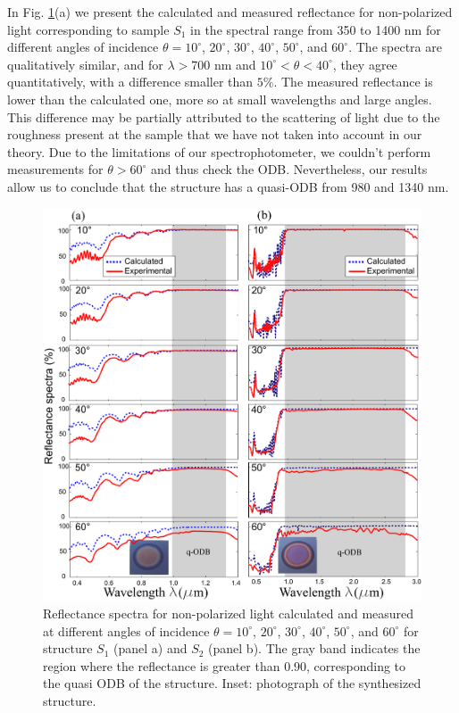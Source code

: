 \documentclass[a4paper,fleqn]{cas-sc}
\begin{document}
	In Fig. \ref{Fig2}(a) we present the calculated and measured
	reflectance for non-polarized light corresponding to sample $S_1$ in the spectral range from 350 to 1400
	nm for different angles of
	incidence $\theta=10^\circ$, $20^\circ$, $30^\circ$, $40^\circ$,
	$50^\circ$, and $60^\circ$. The spectra are qualitatively
	similar, and for $\lambda>700$ nm and $10^\circ < \theta <
	40^\circ$, they agree quantitatively, with a difference smaller
	than $5\%$.
	The
	measured reflectance is lower than the calculated one, more so at
	small wavelengths and large angles. This difference
	may be partially attributed to the scattering of light due to the
	roughness present at the sample
	\cite{Theiss1994,Chavez2020,Ortiz2020} that we have not taken into
	account in our theory. Due to the limitations of our
	spectrophotometer, we couldn't perform measurements for $\theta>60^\circ$ and thus
	check the ODB. Nevertheless, our results allow us to conclude that
	the structure has a quasi-ODB from 980 and
	1340 nm.
	\begin{figure}
		\label{Fig2}
		\begin{center}
			\includegraphics[width=\textwidth]{F2Alternativa.pdf}
		\end{center}
		\caption{Reflectance spectra for non-polarized light calculated and measured at different
			angles of incidence $\theta=10^\circ$, $20^\circ$, $30^\circ$,
			$40^\circ$, $50^\circ$, and $60^\circ$ for structure $S_1$
			(panel a)  and $S_2$ (panel b). The gray band indicates the
			region where the reflectance is greater than  $0.90$,
			corresponding to the quasi ODB of the
			structure. Inset: photograph of the synthesized structure.}
	\end{figure}
\end{document}
